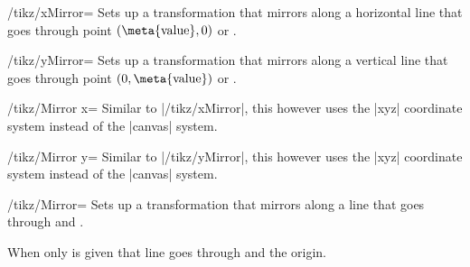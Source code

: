 \begin{key}{/tikz/xMirror=}
  Sets up a transformation that mirrors along a horizontal line that goes through point $(\text{\meta{value}}, 0)$ or .

\begin{codeexample}[preamble=\usetikzlibrary{ext.transformations.mirror}]
\end{codeexample}
\end{key}

\begin{key}{/tikz/yMirror=}
  Sets up a transformation that mirrors along a vertical line that goes through point $(0, \text{\meta{value}})$ or .
\end{key}


\begin{key}{/tikz/Mirror x=}
  Similar to |/tikz/xMirror|, this however uses the |xyz| coordinate system instead of the |canvas| system.
\begin{codeexample}[preamble=\usetikzlibrary{ext.transformations.mirror}]
\end{codeexample}
\end{key}

\begin{key}{/tikz/Mirror y=}
  Similar to |/tikz/yMirror|, this however uses the |xyz| coordinate system instead of the |canvas| system.
\end{key}


\begin{key}{/tikz/Mirror=}
  Sets up a transformation that mirrors along a line that goes through  and .
  
  When only  is given that line goes through  and the origin.
\end{key}

\endinput